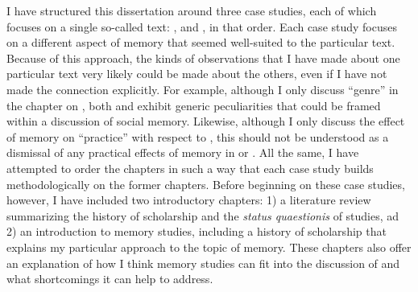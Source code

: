 I have structured this dissertation around three case studies, each of which focuses on a single so-called \rwb text: \chronicles, \ga and \jub, in that order. Each case study focuses on a different aspect of memory that seemed well-suited to the particular text. Because of this approach, the kinds of observations that I have made about one particular text very likely could be made about the others, even if I have not made the connection explicitly. For example, although I only discuss ``genre'' in the chapter on \ga, both \chronicles and \jub exhibit generic peculiarities that could be framed within a discussion of social memory. Likewise, although I only discuss the effect of memory on ``practice'' with respect to \jub, this should not be understood as a dismissal of any practical effects of memory in \chronicles or \ga. All the same, I have attempted to order the chapters in such a way that each case study builds methodologically on the former chapters. Before beginning on these case studies, however, I have included two introductory chapters: 1) a literature review summarizing the history of scholarship and the \emph{status quaestionis} of \rwb studies, ad 2) an introduction to memory studies, including a history of scholarship that explains my particular approach to the topic of memory. These chapters also offer an explanation of how I think memory studies can fit into the discussion of \rwb and what shortcomings it can help to address.